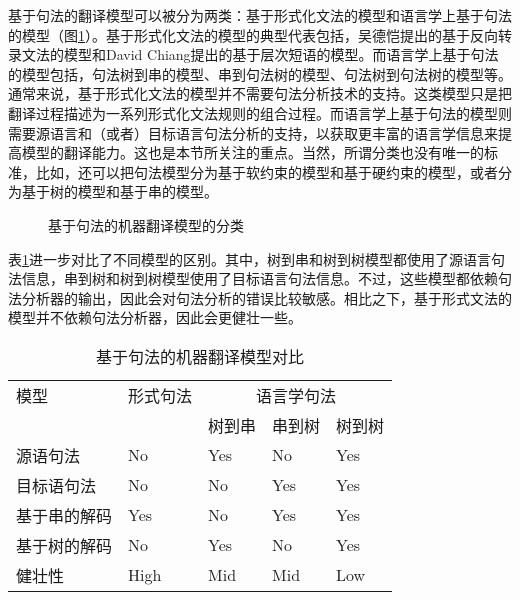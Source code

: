 \parinterval 基于句法的翻译模型可以被分为两类：基于形式化文法的模型和语言学上基于句法的模型（图\ref{fig:4-44}）。基于形式化文法的模型的典型代表包括，吴德恺提出的基于反向转录文法的模型\cite{wu1997stochastic}和David Chiang提出的基于层次短语的模型\cite{chiang2007hierarchical}。而语言学上基于句法的模型包括，句法树到串的模型\cite{liu2006tree,huang2006statistical}、串到句法树的模型\cite{galley2006scalable,galley2004s}、句法树到句法树的模型\cite{eisner2003learning,zhang2008tree,liu2009improving,chiang2010learning}等。通常来说，基于形式化文法的模型并不需要句法分析技术的支持。这类模型只是把翻译过程描述为一系列形式化文法规则的组合过程。而语言学上基于句法的模型则需要源语言和（或者）目标语言句法分析的支持，以获取更丰富的语言学信息来提高模型的翻译能力。这也是本节所关注的重点。当然，所谓分类也没有唯一的标准，比如，还可以把句法模型分为基于软约束的模型和基于硬约束的模型，或者分为基于树的模型和基于串的模型。

\begin{figure}[htp]
\centering

\caption{基于句法的机器翻译模型的分类}
\label{fig:4-44}
\end{figure}

\parinterval 表\ref{tab:4-3}进一步对比了不同模型的区别。其中，树到串和树到树模型都使用了源语言句法信息，串到树和树到树模型使用了目标语言句法信息。不过，这些模型都依赖句法分析器的输出，因此会对句法分析的错误比较敏感。相比之下，基于形式文法的模型并不依赖句法分析器，因此会更健壮一些。

\begin{table}[htp]{
\begin{center}
\caption{基于句法的机器翻译模型对比}
\label{tab:4-3}
{
\begin{tabular}{l | l | l | l | l}
模型 & 形式句法 & \multicolumn{3}{c}{语言学句法} \\
\cline{3-5}
\rule{0pt}{15pt} & & \multicolumn{1}{c|}{树到串} & \multicolumn{1}{c}{串到树} & \multicolumn{1}{|c}{树到树} \\
\hline
源语句法 & No & Yes & No & Yes \\
目标语句法 & No & No & Yes & Yes \\
基于串的解码 & Yes & No & Yes & Yes \\
基于树的解码 & No & Yes & No & Yes \\
健壮性 & High & Mid & Mid & Low \\
\end{tabular}
}
\end{center}
}\end{table}

